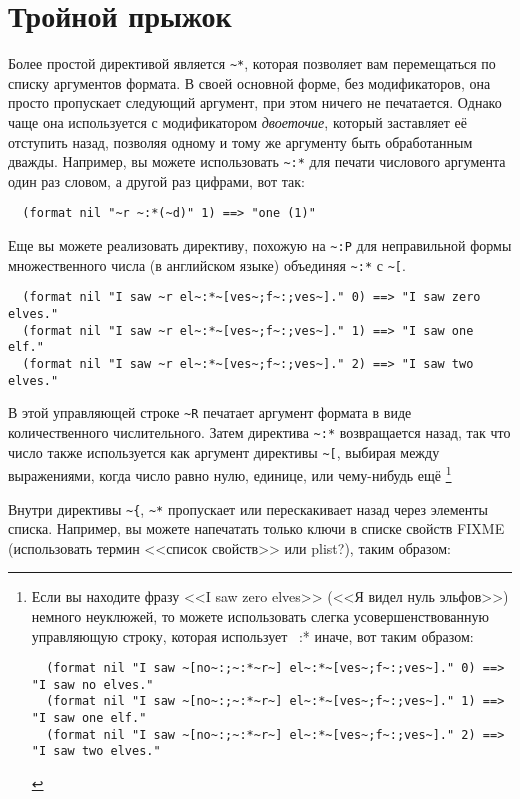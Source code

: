 \section{Тройной прыжок}

Более простой директивой является \lstinline!~*!, которая позволяет вам перемещаться по
списку аргументов формата. В своей основной форме, без модификаторов, она просто
пропускает следующий аргумент, при этом ничего не печатается. Однако чаще она используется
с модификатором \textit{двоеточие}, который заставляет её отступить назад, позволяя одному
и тому же аргументу быть обработанным дважды. Например, вы можете использовать
\lstinline!~:*! для печати числового аргумента один раз словом, а другой раз цифрами, вот
так:

\begin{verbatim}
  (format nil "~r ~:*(~d)" 1) ==> "one (1)"
\end{verbatim}

Еще вы можете реализовать директиву, похожую на \lstinline!~:P! для неправильной формы множественного числа (в английском
языке) объединяя \lstinline!~:*! с \lstinline!~[!.

\begin{verbatim}
  (format nil "I saw ~r el~:*~[ves~;f~:;ves~]." 0) ==> "I saw zero elves."
  (format nil "I saw ~r el~:*~[ves~;f~:;ves~]." 1) ==> "I saw one elf."
  (format nil "I saw ~r el~:*~[ves~;f~:;ves~]." 2) ==> "I saw two elves."
\end{verbatim}

В этой управляющей строке \lstinline!~R! печатает аргумент формата в виде количественного числительного. Затем директива
\lstinline!~:*! возвращается назад, так что число также используется как аргумент директивы \lstinline!~[!, выбирая между
выражениями, когда число равно нулю, единице, или чему-нибудь ещё \footnote{Если вы находите фразу <<I saw zero elves>>
(<<Я видел нуль эльфов>>) немного неуклюжей, то можете использовать слегка усовершенствованную управляющую строку,
которая использует ~:* иначе, вот таким образом:

\begin{verbatim}
  (format nil "I saw ~[no~:;~:*~r~] el~:*~[ves~;f~:;ves~]." 0) ==> "I saw no elves."
  (format nil "I saw ~[no~:;~:*~r~] el~:*~[ves~;f~:;ves~]." 1) ==> "I saw one elf."
  (format nil "I saw ~[no~:;~:*~r~] el~:*~[ves~;f~:;ves~]." 2) ==> "I saw two elves."
\end{verbatim}

}

Внутри директивы \lstinline!~{!, \lstinline!~*! пропускает или перескакивает назад через элементы списка. Например, вы можете
напечатать только ключи в списке свойств FIXME (использовать термин <<список свойств>> или plist?), таким образом:

